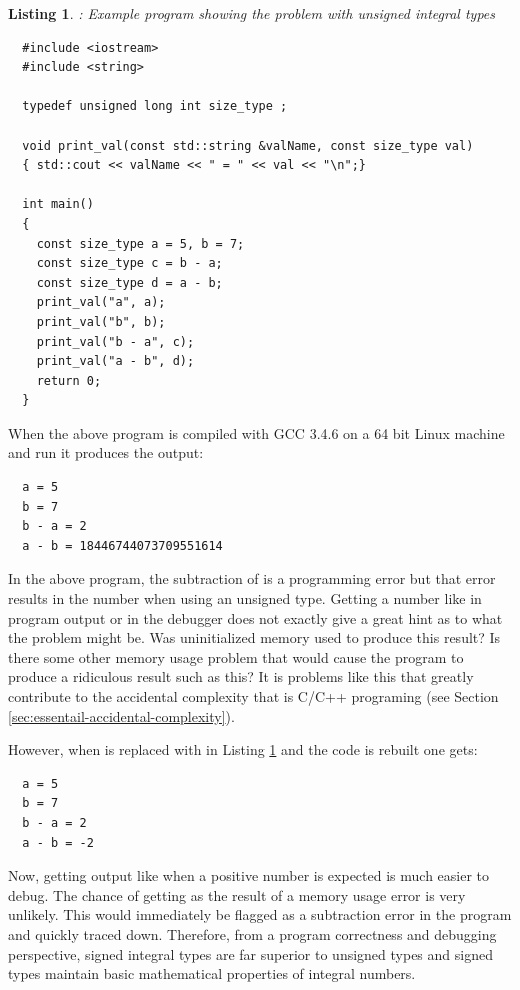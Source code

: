 \documentclass[pdf,ps2pdf,11pt]{SANDreport}
\newtheorem{listing}{Listing}
\begin{document}
{}\begin{listing}: Example program showing the problem with unsigned
integral types
\label{listing:unsigned-int-problem}
{\small\begin{verbatim}
  #include <iostream>
  #include <string>
  
  typedef unsigned long int size_type ;
  
  void print_val(const std::string &valName, const size_type val)
  { std::cout << valName << " = " << val << "\n";}
  
  int main()
  {
    const size_type a = 5, b = 7;
    const size_type c = b - a;
    const size_type d = a - b;
    print_val("a", a);
    print_val("b", b);
    print_val("b - a", c);
    print_val("a - b", d);
    return 0;
  }
\end{verbatim}}
\end{listing}


When the above program is compiled with GCC 3.4.6 on a 64 bit Linux
machine and run it produces the output:


{\small\begin{verbatim}
  a = 5
  b = 7
  b - a = 2
  a - b = 18446744073709551614
\end{verbatim}}


In the above program, the subtraction of {} is a
programming error but that error results in the number
{} when using an unsigned type.  Getting a
number like {} in program output or in the
debugger does not exactly give a great hint as to what the problem
might be.  Was uninitialized memory used to produce this result?  Is
there some other memory usage problem that would cause the program to
produce a ridiculous result such as this?  It is problems like this
that greatly contribute to the accidental complexity that is C/C++
programing (see Section {}\ref{sec:essentail-accidental-complexity}).

However, when {} is replaced with {} in Listing {}\ref{listing:unsigned-int-problem} and the code is
rebuilt one gets:


{\small\begin{verbatim}
  a = 5
  b = 7
  b - a = 2
  a - b = -2
\end{verbatim}}


Now, getting output like {} when a positive number is expected
is much easier to debug.  The chance of getting {} as the
result of a memory usage error is very unlikely.  This would
immediately be flagged as a subtraction error in the program and
quickly traced down.  Therefore, from a program correctness and
debugging perspective, signed integral types are far superior to
unsigned types and signed types maintain basic mathematical properties
of integral numbers.
\end{document}
